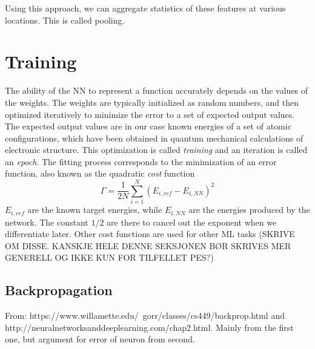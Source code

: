 \documentclass[twoside,english]{uiofysmaster}
\begin{document}
Using this approach, we can aggregate statistics of these features at various locations. This is called pooling. 

\section{Training}
The ability of the NN to represent a function accurately depends on the values of the weights. 
The weights are typically initialized as random numbers, and then optimized iteratively to minimize the error
to a set of expected output values. The expected output values are in our case known energies of a set of atomic
configurations, which have been obtained in quantum mechanical calculations of electronic structure. 
This optimization is called \textit{training} and an iteration is called an \textit{epoch}. 
The fitting process corresponds to the minimization of an error function, also known as the quadratic \textit{cost} function
\begin{equation}
 \Gamma = \frac{1}{2N}\sum_{i=1}^N (E_{i,ref} - E_{i,NN})^2
 \label{quadraticCostFunction}
\end{equation}
$E_{i,ref}$ are the known target energies, while $E_{i,NN}$ are the energies produced by the network. 
The constant $1/2$ are there to cancel out the exponent when we differentiate later. 
Other cost functions are used for other ML tasks (SKRIVE OM DISSE. KANSKJE HELE DENNE SEKSJONEN BØR 
SKRIVES MER GENERELL OG IKKE KUN FOR TILFELLET PES?)

\subsection{Backpropagation} \label{sec:backprop}
From: https://www.willamette.edu/~gorr/classes/cs449/backprop.html and \newline
http://neuralnetworksanddeeplearning.com/chap2.html. 
Mainly from the first one, but argument for error of neuron from second.
\end{document}

